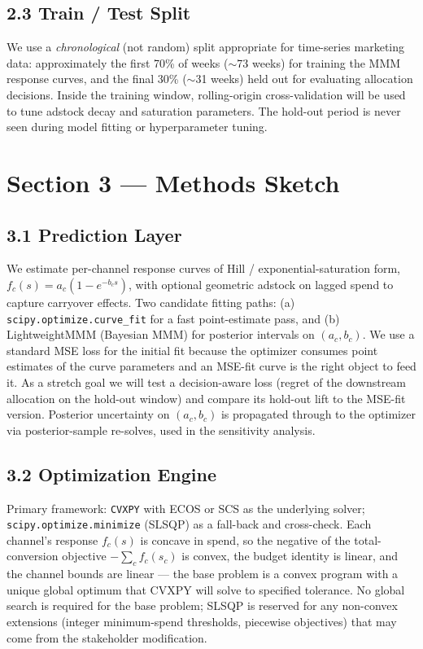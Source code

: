 \documentclass[11pt]{article}
\begin{document}
\subsection*{2.3 \; Train / Test Split}

We use a \emph{chronological} (not random) split appropriate for time-series marketing data: approximately the first 70\% of weeks ($\sim$73 weeks) for training the MMM response curves, and the final 30\% ($\sim$31 weeks) held out for evaluating allocation decisions. Inside the training window, rolling-origin cross-validation will be used to tune adstock decay and saturation parameters. The hold-out period is never seen during model fitting or hyperparameter tuning.

\section{Section 3 --- Methods Sketch}

\subsection*{3.1 \; Prediction Layer}

We estimate per-channel response curves of Hill / exponential-saturation form, $f_c(s) = a_c (1 - e^{-b_c s})$, with optional geometric adstock on lagged spend to capture carryover effects. Two candidate fitting paths: (a) \texttt{scipy.optimize.curve\_fit} for a fast point-estimate pass, and (b) LightweightMMM (Bayesian MMM) for posterior intervals on $(a_c, b_c)$. We use a standard MSE loss for the initial fit because the optimizer consumes point estimates of the curve parameters and an MSE-fit curve is the right object to feed it. As a stretch goal we will test a decision-aware loss (regret of the downstream allocation on the hold-out window) and compare its hold-out lift to the MSE-fit version. Posterior uncertainty on $(a_c, b_c)$ is propagated through to the optimizer via posterior-sample re-solves, used in the sensitivity analysis.

\subsection*{3.2 \; Optimization Engine}

Primary framework: \texttt{CVXPY} with ECOS or SCS as the underlying solver; \texttt{scipy.optimize.minimize} (SLSQP) as a fall-back and cross-check. Each channel's response $f_c(s)$ is concave in spend, so the negative of the total-conversion objective $-\sum_c f_c(s_c)$ is convex, the budget identity is linear, and the channel bounds are linear --- the base problem is a convex program with a unique global optimum that CVXPY will solve to specified tolerance. No global search is required for the base problem; SLSQP is reserved for any non-convex extensions (integer minimum-spend thresholds, piecewise objectives) that may come from the stakeholder modification.
\end{document}
